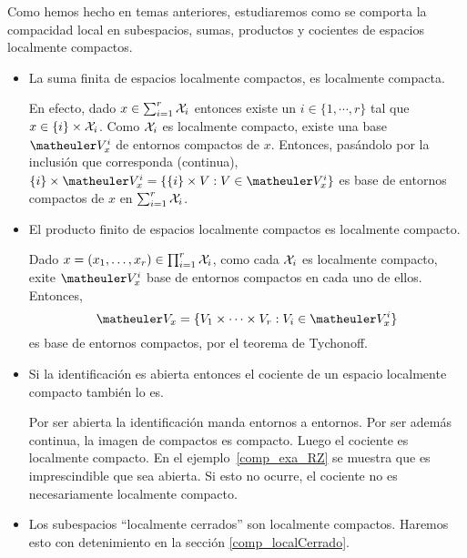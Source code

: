 Como hemos hecho en temas anteriores, estudiaremos como se comporta la compacidad local en subespacios, sumas, productos y cocientes de espacios localmente compactos.

\begin{itemize}
	\item La suma finita de espacios localmente compactos, es localmente compacta.
	
	En efecto, dado $x\in\sum_{i=1}^r \mathcal{X}_i$ entonces existe un $i\in\{1,\cdots,r\}$ tal que $x\in \{i\}\times \mathcal{X}_i$. Como $\mathcal{X}_i$ es localmente compacto, existe una base $\Va{x}^i$ de entornos compactos de $x$. Entonces, pasándolo por la inclusión que corresponda (continua), $\{i\}\times \Va{x}^i=\{\{i\}\times V : V\in\Va{x}^i\}$ es base de entornos compactos de $x$ en $\sum_{i=1}^r \mathcal{X}_i$.
	
	\item El producto finito de espacios localmente compactos es localmente compacto.
	
	Dado $x=(x_1,\dots,x_r)\in\prod_{i=1}^r\mathcal{X}_i$, como cada $\mathcal{X}_i$ es localmente compacto, exite $\Va{x}^i$ base de entornos compactos en cada uno de ellos. Entonces, 
	\[\Va{x}=\{V_1\times\cdots\times V_r: V_i\in\Va{x}^i\}\]
	es base de entornos compactos, por el teorema de Tychonoff.
	
	\item Si la identificación es abierta entonces el cociente de un espacio localmente compacto también lo es.
	
	Por ser abierta la identificación manda entornos a entornos. Por ser además continua, la imagen de compactos es compacto. Luego el cociente es localmente compacto. En el ejemplo~\ref{comp_exa_RZ} se muestra que es imprescindible que sea abierta. Si esto no ocurre, el cociente no es necesariamente localmente compacto.
	
	\item Los subespacios ``localmente cerrados'' son localmente compactos. Haremos esto con detenimiento en la sección \ref{comp_localCerrado}.
\end{itemize}

